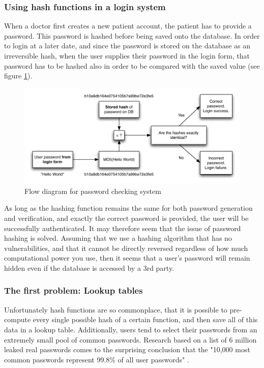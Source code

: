 \documentclass[11pt]{article}
\begin{document}
\subsubsection{Using hash functions in a login system}
When a doctor first creates a new patient account, the patient has to provide a password. This password is hashed before being saved onto the database. In order to login at a later date, and since the password is stored on the database as an irreversible hash, when the user supplies their password in the login form, that password has to be hashed also in order to be compared with the saved value (see figure \ref{login-flow-diagram}).

\begin{figure}[h]
\centering
\includegraphics[scale=0.85]{passwordhashing-loginform}
\caption{Flow diagram for password checking system}
\label{login-flow-diagram}
\end{figure}

As long as the hashing function remains the same for both password generation and verification, and exactly the correct password is provided, the user will be successfully authenticated. It may therefore seem that the issue of password hashing is solved. Assuming that we use a hashing algorithm that has no vulnerabilities, and  that it cannot be directly reversed regardless of how much computational power you use, then it seems that a user's password will remain hidden even if the database is accessed by a 3rd party. 

\subsubsection{The first problem: Lookup tables} \label{salting}

Unfortunately hash functions are so commonplace, that it is possible to pre-compute every single possible hash of a certain function, and then save all of this data in a lookup table. Additionally, users tend to select their passwords from an extremely small pool of common passwords. Research based on a list of 6 million leaked real passwords comes to the surprising conclusion that the "10,000 most common passwords represent 99.8\% of all user passwords" \cite{xato:top-passwords}.
\end{document}
